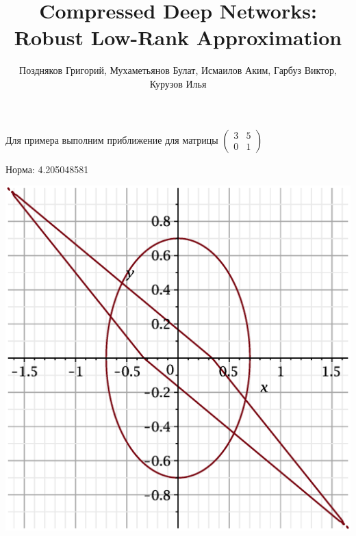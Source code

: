 \documentclass{beamer}
\title{Compressed Deep Networks: Robust Low-Rank Approximation}
\author{Поздняков Григорий, Мухаметьянов Булат, Исмаилов Аким, Гарбуз Виктор, Курузов Илья}
\begin{document}

\begin{frame}%
\titlepage
\end{frame}

\begin{frame}
Для примера выполним приближение для матрицы 
$\begin{pmatrix}
  3 & 5\\
  0 & 1
 \end{pmatrix}
$
\end{frame}

\begin{frame}
Норма: 4.205048581
    \begin{center}
        \includegraphics[scale=0.4]{pictures/1.eps}
    \end{center}
\end{frame}
\end{document}
